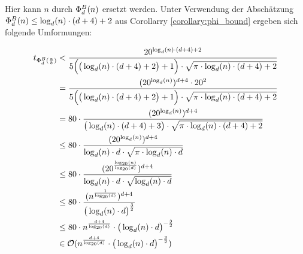 \documentclass{article}
\theoremstyle{nonumberplain}
\begin{document}
Hier kann \(n\) durch \(\Phi_{d}^{B}(n)\) ersetzt werden.
Unter Verwendung der Abschätzung \(\Phi_{d}^{B}(n) \leq \log_d(n) \cdot (d+4) + 2\) aus Corollarry \ref{corollary:phi_bound} ergeben sich folgende Umformungen:


\begin{align*}
    t_{\Phi_{d}^{B}(\frac{a}{b})}
    &< \frac{20^{\log_d(n)\cdot(d+4)+2}}{5\Big(\big(\log_d(n) \cdot (d+4)+2\big)+1\Big) \cdot \sqrt{\pi \cdot \log_d(n) \cdot (d+4) + 2}} \\
    &= \frac{(20^{\log_d(n)})^{d+4}\cdot20^2}{5\Big(\big(\log_d(n) \cdot (d+4)+2\big)+1\Big) \cdot \sqrt{\pi \cdot \log_d(n) \cdot (d + 4) + 2}} \\
    &= 80\cdot\frac{(20^{\log_d(n)})^{d+4}}{\big(\log_d(n) \cdot (d+4)+3\big) \cdot\sqrt{\pi \cdot \log_d(n)\cdot(d+4)+2}} \\
    &\leq 80\cdot\frac{(20^{\log_d(n)})^{d+4}}{\log_d(n) \cdot d \cdot \sqrt{\pi \cdot \log_d(n) \cdot d}} \\
    &\leq 80\cdot\frac{(20^{\frac{\log_{20}(n)}{\log_{20}(d)}})^{d+4}}{\log_d(n) \cdot d \cdot \sqrt{\log_d(n) \cdot d}} \\
    &\leq 80\cdot\frac{(n^{\frac{1}{\log_{20}(d)}})^{d+4}}{\big(\log_d(n) \cdot d\big)^{\frac{3}{2}}} \\
    &\leq 80 \cdot n^{\frac{d+4}{\log_{20}(d)}} \cdot \big(\log_d(n) \cdot d\big)^{-\frac{3}{2}} \\
    &\in \mathcal{O}(n^{\frac{d+4}{\log_{20}(d)}} \cdot \big(\log_d(n) \cdot d\big)^{-\frac{3}{2}}) \\
\end{align*}
\end{document}
